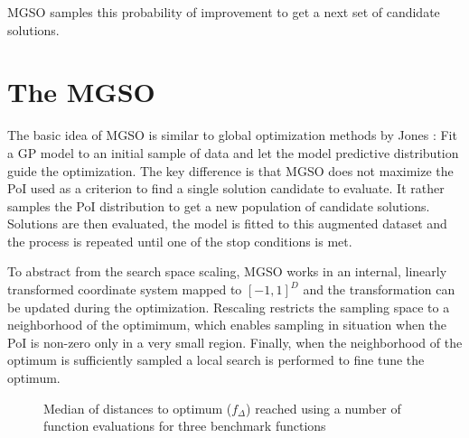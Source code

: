 \documentclass{sig-alternate}
\begin{document}
MGSO samples this probability of improvement to get a next set of candidate solutions.

\section{The MGSO}

The basic idea of MGSO is similar to global optimization methods by Jones \cite{jones01taxonomy}: Fit a 
GP model to an initial sample of data and let the model predictive distribution guide the optimization. 
The key difference is that MGSO does not maximize the PoI used as a criterion to find a single
solution candidate to evaluate. It rather samples the PoI distribution to get a new population of
candidate solutions. Solutions are then evaluated, the model is fitted to this augmented 
dataset and the process is repeated until one of the stop conditions is met.

To abstract from the search space scaling, MGSO works in an internal, linearly transformed coordinate system 
mapped to $[-1, 1]^D$ and the transformation can be updated during the optimization. Rescaling restricts the 
sampling space to a neighborhood of the optimimum, which enables sampling in situation when the PoI is non-zero 
only in a very small region. Finally, when the neighborhood of the optimum is sufficiently sampled a local search 
is performed to fine tune the optimum. 

\begin{figure}
  \centering

  \caption{
    Median of distances to optimum ($f_{\Delta}$) reached using a number of function evaluations
    for three benchmark functions}
\end{figure}
\end{document}
